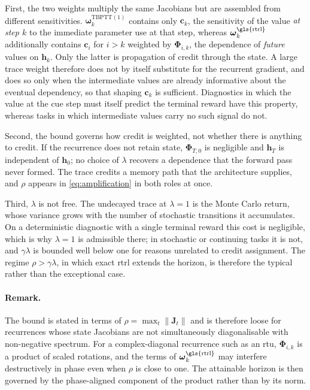 \documentclass{article}
\begin{document}
First, the two weights multiply the same Jacobians but are assembled from
different sensitivities. $\boldsymbol{\omega}_k^{\mathrm{TBPTT(1)}}$ contains only
$\boldsymbol{c}_k$, the sensitivity of the value \emph{at step $k$} to the
immediate parameter use at that step, whereas
$\boldsymbol{\omega}_k^{\mathrm{\gls{rtrl}}}$ additionally contains
$\boldsymbol{c}_i$ for $i > k$ weighted by $\boldsymbol{\Phi}_{i,k}$, the dependence
of \emph{future} values on $\boldsymbol{h}_k$. Only the latter is propagation of
credit through the state. A large trace weight therefore does not by itself
substitute for the recurrent gradient, and does so only when the intermediate
values are already informative about the eventual dependency, so that shaping
$\boldsymbol{c}_k$ is sufficient. Diagnostics in which the value at the cue step
must itself predict the terminal reward have this property, whereas tasks in which
intermediate values carry no such signal do not.

Second, the bound governs how credit is weighted, not whether there is anything
to credit. If the recurrence does not retain state, $\boldsymbol{\Phi}_{T,0}$ is
negligible and $\boldsymbol{h}_T$ is independent of $\boldsymbol{h}_0$; no choice of
$\lambda$ recovers a dependence that the forward pass never formed. The trace
credits a memory path that the architecture supplies, and $\rho$ appears in
\eqref{eq:amplification} in both roles at once.

Third, $\lambda$ is not free. The undecayed trace at $\lambda = 1$ is the
Monte Carlo return, whose variance grows with the number of stochastic
transitions it accumulates. On a deterministic diagnostic with a single terminal
reward this cost is negligible, which is why $\lambda = 1$ is admissible there;
in stochastic or continuing tasks it is not, and $\gamma\lambda$ is bounded well
below one for reasons unrelated to credit assignment. The regime
$\rho > \gamma\lambda$, in which exact \gls{rtrl} extends the horizon, is
therefore the typical rather than the exceptional case.

\paragraph{Remark.} The bound is stated in terms of $\rho = \max_t \|\boldsymbol{J}_t\|$
and is therefore loose for recurrences whose state Jacobians are not
simultaneously diagonalisable with non-negative spectrum. For a complex-diagonal
recurrence such as an \gls{rtu}, $\boldsymbol{\Phi}_{i,k}$ is a product of scaled
rotations, and the terms of $\boldsymbol{\omega}_k^{\mathrm{\gls{rtrl}}}$ may
interfere destructively in phase even when $\rho$ is close to one. The attainable
horizon is then governed by the phase-aligned component of the product rather
than by its norm.
\end{document}
